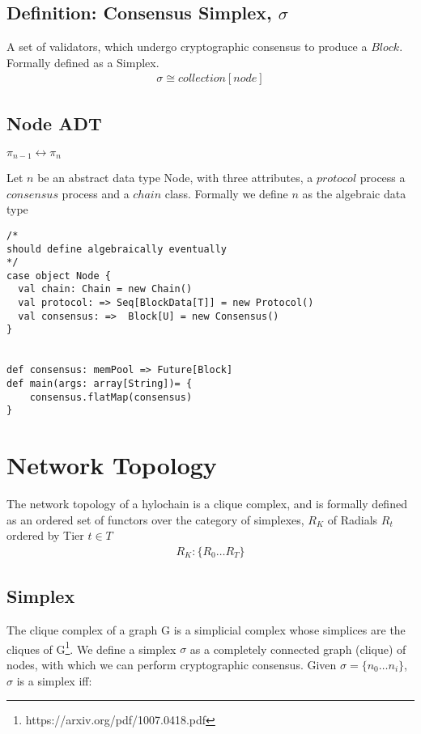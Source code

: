 \documentclass{article}
\begin{document}
\subsection{Definition: Consensus Simplex, $\sigma$}
A set of validators, which undergo cryptographic consensus to produce a $Block$. Formally defined as a Simplex.
\begin{equation} \label{eq1}
\begin{split}
\sigma \cong collection[node]
\end{split}
\end{equation}

\subsection{Node ADT}
$\pi_{n-1} \longleftrightarrow \pi_{n}$


Let $n$ be an abstract data type Node, with three attributes, a $protocol$ process a $consensus$ process and a $chain$ class. Formally we define $n$ as the algebraic data type
\begin{lstlisting}
/*
should define algebraically eventually
*/
case object Node {
  val chain: Chain = new Chain()
  val protocol: => Seq[BlockData[T]] = new Protocol()
  val consensus: =>  Block[U] = new Consensus()
}


def consensus: memPool => Future[Block]
def main(args: array[String])= {
	consensus.flatMap(consensus)
}
\end{lstlisting}

\section{Network Topology}
The network topology of a hylochain is a clique complex, and is formally defined as an ordered set of functors over the category of simplexes, $R_K$ of Radials $R_t$ ordered by Tier $t \in T$
\begin{equation} \label{eq1}
\begin{split}
R_K: \{R_0 \dots R_T \}
\end{split}
\end{equation}

\subsection{Simplex}
The clique complex of a graph G is a simplicial complex whose simplices are the cliques of G\footnote{https://arxiv.org/pdf/1007.0418.pdf}. We define a simplex $\sigma$ as a completely connected graph (clique) of nodes, with which we can perform cryptographic consensus. Given $\sigma = \{n_0 \dots n_i\}$, $\sigma$ is a simplex iff:
\end{document}
